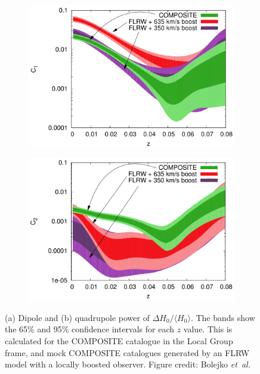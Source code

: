 \documentclass[a4paper,12pt]{report}
\newcommand{\etal}{\emph{et~al.\ }}
\begin{document}
\begin{figure}[t]
  \centering
  \begin{subfigure}[b]{0.45\textwidth}
    \includegraphics[width=\textwidth]{Composite Dipole Power vs FLRW with boost.png}
    \caption{}
  \end{subfigure}
  \hfill
  \begin{subfigure}[b]{0.45\textwidth}
    \includegraphics[width=\textwidth]{Composite quadrupole Power vs FLRW with boost.png}
    \caption{}
  \end{subfigure}
  \caption{(a) Dipole and (b) quadrupole power of $\Delta H_0/\langle H_0 \rangle$. The bands show the 65\% and 95\% confidence intervals for each $z$ value. This is calculated for the COMPOSITE catalogue in the Local Group frame, and mock COMPOSITE catalogues generated by an FLRW model with a locally boosted observer. Figure credit: Bolejko \etal \cite{RN3}}
  \label{fig: COMPOSITE dipole and quadrupole vs FLRW boosted observer}
\end{figure}
\end{document}

